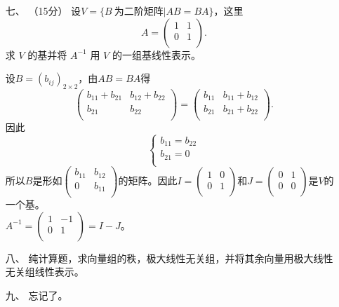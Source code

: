 \begin{enumerate}[1~]
\item[七、]（15分）
设$V = \{B\ \text{为二阶矩阵}| AB = BA\}$，这里\[
A=\left( \begin{matrix}
	1&		1\\
	0&		1\\
\end{matrix} \right).
\]
求 $V$ 的基并将 $A^{-1}$ 用 $V$ 的一组基线性表示。
\begin{solution}
设$B=(b_{ij})_{2\times 2}$，由$AB=BA$得
\[
\left( \begin{matrix}
	b_{11}+b_{21}&		b_{12}+b_{22}\\
	b_{21}&		b_{22}\\
\end{matrix} \right) =\left( \begin{matrix}
	b_{11}&		b_{11}+b_{12}\\
	b_{21}&		b_{21}+b_{22}\\
\end{matrix} \right) .
\]
因此\[
\left\{ \begin{array}{l}
	b_{11}=b_{22}\\
	b_{21}=0\\
\end{array} \right. 
\]
所以$B$是形如$\left( \begin{smallmatrix}
	b_{11}&		b_{12}\\
	0&		b_{11}\\
\end{smallmatrix} \right) $的矩阵。因此$I=\left( \begin{smallmatrix}
	1&		0\\
	0&		1\\
\end{smallmatrix} \right) 
$和$J=\left( \begin{smallmatrix}
	0&		1\\
	0&		0\\
\end{smallmatrix} \right) 
$是$V$的一个基。\\
$A^{-1}=\left( \begin{smallmatrix}
	1&		-1\\
	0&		1\\
\end{smallmatrix} \right) =I-J
$。
\end{solution}

\item[八、]
纯计算题，求向量组的秩，极大线性无关组，并将其余向量用极大线性无关组线性表示。

\item[九、]
忘记了。


\end{enumerate}
